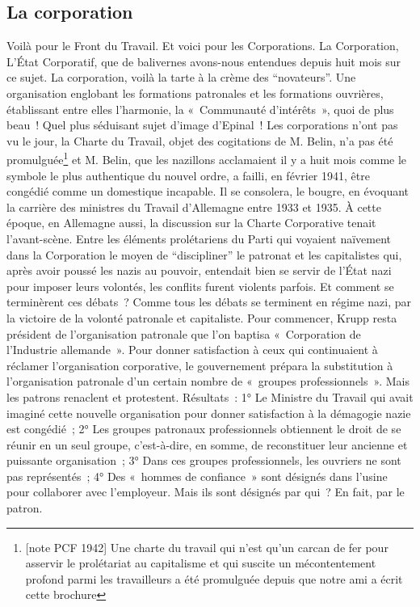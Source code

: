 \documentclass[french,twoside]{book} %
\begin{document}
\subsection[La corporation]{La corporation}
\noindent Voilà pour le Front du Travail. Et voici pour les Corporations. La Corporation, L’État Corporatif, que de balivernes avons-nous entendues depuis huit mois sur ce sujet. La corporation, voilà la tarte à la crème des “novateurs”. Une organisation englobant les formations patronales et les formations ouvrières, établissant entre elles l’harmonie, la « Communauté d’intérêts », quoi de plus beau ! Quel plus séduisant sujet d’image d’Epinal ! Les corporations n’ont pas vu le jour, la Charte du Travail, objet des cogitations de M. Belin, n’a pas été promulguée\footnote{[note PCF 1942] Une charte du travail qui n’est qu’un carcan de fer pour asservir le prolétariat au capitalisme et qui suscite un mécontentement profond parmi les travailleurs a été promulguée depuis que notre ami a écrit cette brochure} et M. Belin, que les nazillons acclamaient il y a huit mois comme le symbole le plus authentique du nouvel ordre, a failli, en février 1941, être congédié comme un domestique incapable. Il se consolera, le bougre, en évoquant la carrière des ministres du Travail d’Allemagne entre 1933 et 1935. À cette époque, en Allemagne aussi, la discussion sur la Charte Corporative tenait l’avant-scène. Entre les éléments prolétariens du Parti qui voyaient naïvement dans la Corporation le moyen de “discipliner” le patronat et les capitalistes qui, après avoir poussé les nazis au pouvoir, entendait bien se servir de l’État nazi pour imposer leurs volontés, les conflits furent violents parfois. Et comment se terminèrent ces débats ? Comme tous les débats se terminent en régime nazi, par la victoire de la volonté patronale et capitaliste. Pour commencer, Krupp resta président de l’organisation patronale que l’on baptisa « Corporation de l’Industrie allemande ». Pour donner satisfaction à ceux qui continuaient à réclamer l’organisation corporative, le gouvernement prépara la substitution à l’organisation patronale d’un certain nombre de « groupes professionnels ». Mais les patrons renaclent et protestent. Résultats : 1° Le Ministre du Travail qui avait imaginé cette nouvelle organisation pour donner satisfaction à la démagogie nazie est congédié ; 2° Les groupes patronaux professionnels obtiennent le droit de se réunir en un seul groupe, c’est-à-dire, en somme, de reconstituer leur ancienne et puissante organisation ; 3° Dans ces groupes professionnels, les ouvriers ne sont pas représentés ; 4° Des « hommes de confiance » sont désignés dans l’usine pour collaborer avec l’employeur. Mais ils sont désignés par qui ? En fait, par le patron.
\end{document}
